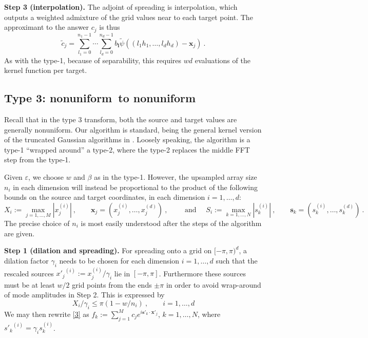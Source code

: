\documentclass[10pt]{article}
\newcommand{\be}{\begin{equation}}
\newcommand{\ee}{\end{equation}}
\newcommand{\mbf}[1]{{\mathbf #1}}
\newcommand{\eps}{\varepsilon}
\newcommand{\xx}{\mbf{x}}
\newcommand{\sss}{\mbf{s}}
\newcommand{\freq}{\beta}          %
\newcommand{\ppsi}{{\tilde\psi}}   %
\newcommand{\NU}{{nonuniform}}       %
\begin{document}
{\bf Step 3 (interpolation).}
The adjoint of spreading is interpolation, which
outputs a weighted admixture of the
grid values near to each target point.
The approximant to the answer $c_j$ is thus
\be
\tilde c_j = \sum_{l_1=0}^{n_1-1} \cdots \sum_{l_d=0}^{n_d-1}
b_\mbf{l} \ppsi((l_1h_1,\dots,l_dh_d) - \xx_j)
~.
\label{interp}
\ee
As with the type-1,
because of separability,
this requires $wd$ evaluations of the kernel function per target.



\subsection{Type 3: \NU\ to \NU}

Recall that in the type 3 transform,
both the source and target values are generally \NU.
Our algorithm is standard, being
the general kernel version of the truncated Gaussian algorithms in
\cite[Alg.~3]{nufft} \cite[Alg.~2]{elbel} \cite{nufft3}
\cite[Sec.~1.3]{nfftchap}.
Loosely speaking, the algorithm is a
type-1 ``wrapped around'' a type-2, %
where the type-2 replaces the middle FFT step from the type-1.

Given $\eps$, we choose $w$ and $\freq$ as in the type-1.
However, the upsampled array size $n_i$ in each dimension
will instead be proportional to the product of the following bounds on the
source and target coordinates,
in each dimension $i=1,\dots,d$:
\be
X_i := \max_{j=1,\dots,M} |x_j^{(i)}|
~,\qquad
\xx_j = (x_j^{(i)},\dots,x_j^{(d)})
~,\qquad\mbox{ and }
\quad
S_i := \max_{k=1,\dots,N} |s_k^{(i)}|
~,\qquad
\sss_k = (s_k^{(i)},\dots,s_k^{(d)})
~.
\label{XS}
\ee
The precise choice of $n_i$ is most easily understood after the
steps of the algorithm are given.

{\bf Step 1 (dilation and spreading).}
For spreading onto a grid on $[-\pi,\pi)^d$,
a dilation factor $\gamma_i$ needs to be chosen
for each dimension $i=1,\ldots,d$ 
such that the rescaled sources ${x'_j}^{(i)} := x_j^{(i)}/\gamma_i$
lie in $[-\pi,\pi]$. Furthermore these sources must be
at least $w/2$ grid points
from the ends $\pm\pi$ in order
to avoid wrap-around of mode amplitudes in Step 2.
This is expressed by
\be
X_i/\gamma_i \le \pi(1 - w/n_i)
~, \qquad i=1,\dots,d
\label{cond1}
\ee
We may then rewrite \eqref{3} as
$f_k := \sum_{j=1}^M c_j e^{i \sss'_k \cdot \xx'_j}$, $k=1,\dots, N$,
where ${s'_k}^{(i)} = \gamma_i s_k^{(i)}$.
\end{document}
